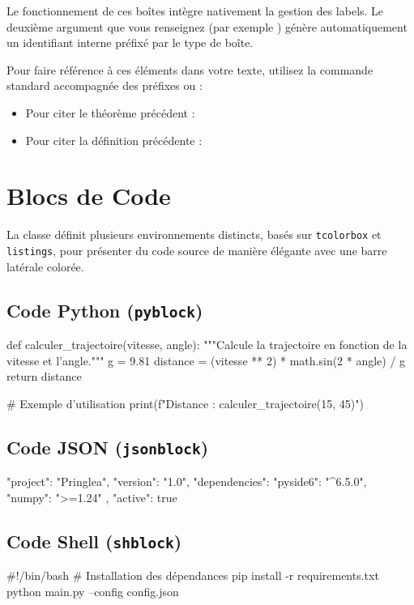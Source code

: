 Le fonctionnement de ces boîtes intègre nativement la gestion des labels. Le deuxième argument que vous renseignez (par exemple ) génère automatiquement un identifiant interne préfixé par le type de boîte.

Pour faire référence à ces éléments dans votre texte, utilisez la commande standard  accompagnée des préfixes  ou  :

\begin{itemize}
    \item Pour citer le théorème précédent : 
    \item Pour citer la définition précédente : 
\end{itemize}

\section{Blocs de Code}

La classe définit plusieurs environnements distincts, basés sur \texttt{tcolorbox} et \texttt{listings}, pour présenter du code source de manière élégante avec une barre latérale colorée.

\subsection{Code Python (\texttt{pyblock})}
\begin{pyblock}
def calculer_trajectoire(vitesse, angle):
    """Calcule la trajectoire en fonction de la vitesse et l'angle."""
    g = 9.81
    distance = (vitesse ** 2) * math.sin(2 * angle) / g
    return distance

# Exemple d'utilisation
print(f"Distance : {calculer_trajectoire(15, 45)}")
\end{pyblock}

\subsection{Code JSON (\texttt{jsonblock})}
\begin{jsonblock}
{
  "project": "Pringlea",
  "version": "1.0",
  "dependencies": {
    "pyside6": "^6.5.0",
    "numpy": ">=1.24"
  },
  "active": true
}
\end{jsonblock}

\subsection{Code Shell (\texttt{shblock})}
\begin{shblock}
#!/bin/bash
# Installation des dépendances
pip install -r requirements.txt
python main.py --config config.json
\end{shblock}

